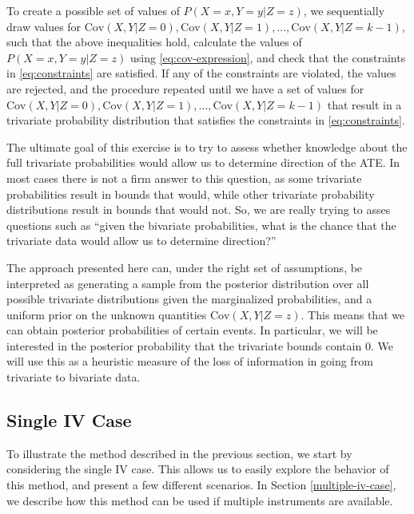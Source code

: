 \documentclass[
]{article}
\theoremstyle{plain}
\begin{document}
To create a possible set of values of \(P(X = x, Y = y | Z = z)\), we sequentially draw values for \(\text{Cov}(X, Y | Z = 0), \text{Cov}(X, Y | Z = 1), ..., \text{Cov}(X, Y | Z = k-1)\), such that the above inequalities hold, calculate the values of \(P(X = x, Y = y | Z = z)\) using \eqref{eq:cov-expression}, and check that the constraints in \eqref{eq:constraints} are satisfied. If any of the constraints are violated, the values are rejected, and the procedure repeated until we have a set of values for \(\text{Cov}(X, Y | Z = 0), \text{Cov}(X, Y | Z = 1), ..., \text{Cov}(X, Y | Z = k-1)\) that result in a trivariate probability distribution that satisfies the constraints in \eqref{eq:constraints}.

The ultimate goal of this exercise is to try to assess whether knowledge about the full trivariate probabilities would allow us to determine direction of the ATE. In most cases there is not a firm answer to this question, as some trivariate probabilities result in bounds that would, while other trivariate probability distributions result in bounds that would not. So, we are really trying to asses questions such as ``given the bivariate probabilities, what is the chance that the trivariate data would allow us to determine direction?''

The approach presented here can, under the right set of assumptions, be interpreted as generating a sample from the posterior distribution over all possible trivariate distributions given the marginalized probabilities, and a uniform prior on the unknown quantities \(\text{Cov}(X, Y | Z = z)\). This means that we can obtain posterior probabilities of certain events. In particular, we will be interested in the posterior probability that the trivariate bounds contain \(0\). We will use this as a heuristic measure of the loss of information in going from trivariate to bivariate data.

\hypertarget{single-iv-case}{%
\subsection{Single IV Case}\label{single-iv-case}}

To illustrate the method described in the previous section, we start by considering the single IV case. This allows us to easily explore the behavior of this method, and present a few different scenarios. In Section \ref{multiple-iv-case}, we describe how this method can be used if multiple instruments are available.
\end{document}
